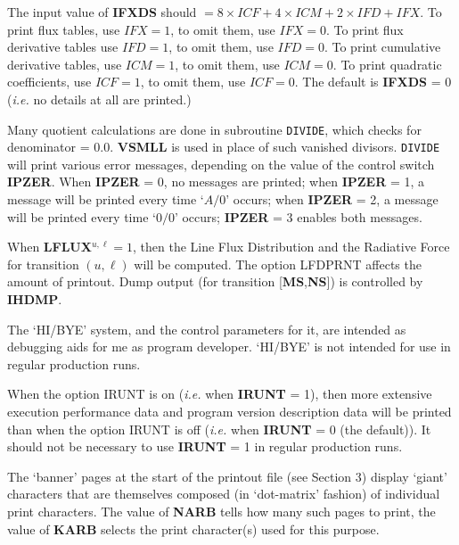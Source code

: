 The input value of {\bf IFXDS} should $= 8 \times ICF + 4 \times ICM +
2 \times IFD + IFX$. \np
To print flux tables, use $IFX = 1$, to omit them,
use $IFX = 0$. \np
To print flux derivative tables use $IFD = 1$, to omit
them, use $IFD = 0$. \np
To print cumulative derivative tables, use $ICM = 1$,
to omit them, use $ICM = 0$. \np
To print quadratic coefficients, use $ICF = 1$,
to omit them, use $ICF = 0$. \np
The default is {\bf IFXDS} = 0 ({\it i.e.} no details at all are printed.)
\blankline
\blankline
\centerline{}
\space \noindent
Many quotient calculations are done in subroutine {\tt DIVIDE},
which checks for denominator = 0.0. {\bf VSMLL} is used in place of
such vanished divisors. \np
{\tt DIVIDE} will print various error messages,
depending on the value of the control switch {\bf IPZER}. When {\bf IPZER}
= 0, no messages are printed; when {\bf IPZER} = 1, a message will be
printed every time `$A/0$' occurs; when {\bf IPZER} = 2, a message will
be printed every time `$0/0$' occurs; {\bf IPZER} = 3 enables both messages.
\blankline
\blankline
\centerline{}
\space \noindent
When {\bf LFLUX}$^{u,\ell} = 1$, then the Line Flux Distribution and the
Radiative Force for transition $(u,\ell)$ will be computed. The option
LFDPRNT affects the amount of printout. Dump output (for transition
[{\bf MS},{\bf NS}]) is controlled by {\bf IHDMP}.
\ej
\centerline{}
\space \noindent
The `HI/BYE' system, and the control parameters for it, are intended as
debugging aids for me as program developer. `HI/BYE' is not intended for
use in regular production runs.
\blankline
\blankline
\centerline{}
\space \noindent
When the option IRUNT is on ({\it i.e.} when {\bf IRUNT} = 1),
then more extensive execution performance data and
program version description data will be printed than when 
the option IRUNT is off ({\it i.e.} when {\bf IRUNT} = 0
(the default)). It should not be necessary to use {\bf IRUNT} = 1
in regular production runs.
\blankline
\blankline
\centerline{}
\space \noindent
The `banner' pages at the start of the printout file (see Section 3) display
`giant' characters that are themselves composed (in `dot-matrix' fashion)
of individual print characters. The value of {\bf NARB} tells how many such
pages to print, the value of {\bf KARB} selects the print
character(s) used for this purpose. \np
